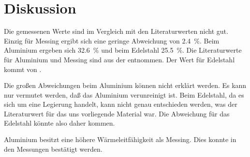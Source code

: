 
\section{Diskussion}

Die gemessenen Werte sind im Vergleich mit den Literaturwerten nicht
gut. Einzig für Messing ergibt sich eine geringe Abweichung von
\SI{2.4}{\percent}. Beim Aluminium ergeben sich \SI{32.6}{\percent} und
beim Edelstahl \SI{25.5}{\percent}. Die Literaturwerte für Aluminium und
Messing sind aus der \textcite{wikipedia:waermeleitfaehigkeit}
entnommen. Der Wert für Edelstahl kommt von
\textcite{schweizer-fn:waermeleitfaehigkeiten}.

Die großen Abweichungen beim Aluminium können nicht erklärt werden. Es
kann nur vermutet werden, daß das Aluminium verunreinigt ist. Beim
Edelstahl, da es sich um eine Legierung handelt, kann nicht genau
entschieden werden, was der Literaturwert für das uns vorliegende
Material war. Die Abweichung für das Edelstahl könnte also daher kommen.

Aluminium besitzt eine höhere Wärmeleitfähigkeit als Messing. Dies
konnte in den Messungen bestätigt werden.
